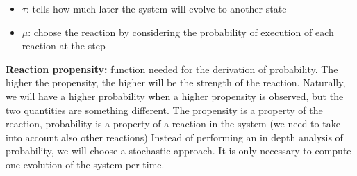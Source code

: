   \begin{itemize}
    \item \(\tau\): tells how much later the system will evolve to another state
    \item \(\mu\): choose the reaction by considering the probability of execution of each reaction at the step
  \end{itemize}

  \textbf{Reaction propensity:} function needed for the derivation of probability.
  The higher the propensity, the higher will be the strength of the reaction.
  Naturally, we will have a higher probability when a higher propensity is observed, but the two quantities are something different.
  The propensity is a property of the reaction, probability is a property of a reaction in the system (we need to take into account also other reactions) Instead of performing an in depth analysis of probability, we will choose a stochastic approach.
  It is only necessary to compute one evolution of the system per time.
